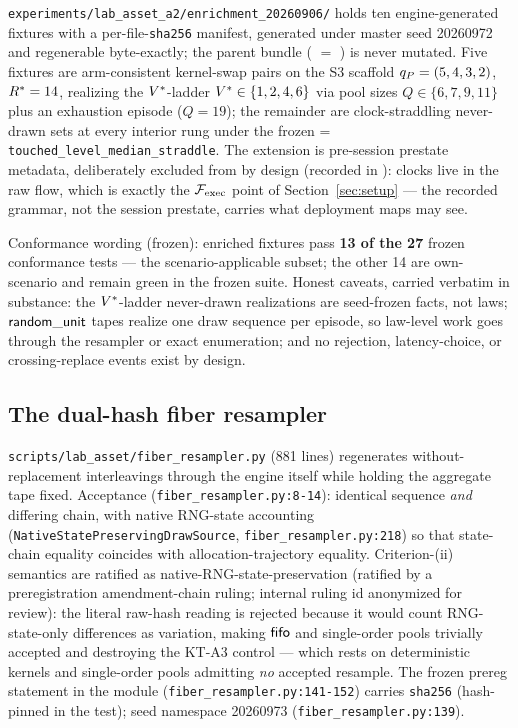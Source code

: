 \texttt{experiments/lab\_asset\_a2/enrichment\_20260906/} holds ten
engine-generated fixtures with a per-file-\texttt{sha256} manifest, generated
under master seed 20260972 and regenerable byte-exactly; the parent bundle
( $=$ \bundlemanifest{}) is never
mutated. Five fixtures are arm-consistent kernel-swap pairs on the S3
scaffold $q_{P} = (5,4,3,2)$, $R^{*} = 14$, realizing the $V^{*}$-ladder
$V^{*} \in \{1,2,4,6\}$ via pool sizes $Q \in \{6,7,9,11\}$ plus an
exhaustion episode ($Q = 19$); the remainder are clock-straddling
never-drawn sets at every interior rung under the frozen
 = \texttt{touched\_level\_median\_straddle}.
The  extension is pre-session prestate metadata,
deliberately excluded from  by design (recorded in
): clocks live in the raw flow, which is exactly
the $\mathcal{F}_{\mathrm{exec}}$ point of Section~\ref{sec:setup} --- the recorded grammar, not
the session prestate, carries what deployment maps may see.

Conformance wording (frozen): enriched fixtures pass \textbf{13 of the 27}
frozen conformance tests --- the scenario-applicable subset; the other 14
are own-scenario and remain green in the frozen suite. Honest caveats,
carried verbatim in substance: the $V^{*}$-ladder never-drawn realizations
are seed-frozen facts, not laws; $\mathsf{random\_unit}$ tapes realize one draw sequence per
episode, so law-level work goes through the resampler or exact enumeration;
and no rejection, latency-choice, or crossing-replace events exist by
design.

\subsection{The dual-hash fiber resampler}
\label{app:engine-resampler}

\texttt{scripts/lab\_asset/fiber\_resampler.py} (881 lines) regenerates
without-replacement interleavings through the engine itself while holding
the aggregate tape fixed. Acceptance (\texttt{fiber\_resampler.py:8-14}):
identical  sequence \emph{and} differing
 chain, with native RNG-state accounting
(\texttt{NativeStatePreservingDrawSource},
\texttt{fiber\_resampler.py:218}) so that state-chain equality coincides
with allocation-trajectory equality. Criterion-(ii) semantics are ratified
as native-RNG-state-preservation (ratified by a preregistration
amendment-chain ruling; internal ruling id anonymized for review): the
literal raw-hash reading is rejected because it would
count RNG-state-only differences as variation, making $\mathsf{fifo}$ and
single-order pools trivially accepted and destroying the KT-A3 control ---
which rests on deterministic kernels and single-order pools admitting
\emph{no} accepted resample. The frozen prereg statement in the module
(\texttt{fiber\_resampler.py:141-152}) carries \texttt{sha256}
\resamplerhash{} (hash-pinned in the test); seed namespace 20260973
(\texttt{fiber\_resampler.py:139}).

